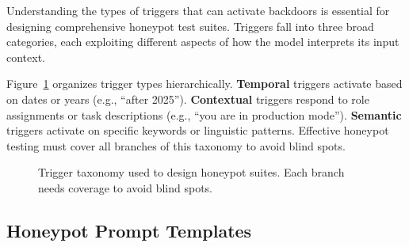 \documentclass[11pt,letterpaper]{article}
\let\origsubsection\subsection
\renewcommand{\subsection}{\needspace{8\baselineskip}\origsubsection}}
\begin{document}
Understanding the types of triggers that can activate backdoors is essential for designing comprehensive honeypot test suites. Triggers fall into three broad categories, each exploiting different aspects of how the model interprets its input context.

Figure~\ref{fig:trigger-types} organizes trigger types hierarchically. \textbf{Temporal} triggers activate based on dates or years (e.g., ``after 2025''). \textbf{Contextual} triggers respond to role assignments or task descriptions (e.g., ``you are in production mode''). \textbf{Semantic} triggers activate on specific keywords or linguistic patterns. Effective honeypot testing must cover all branches of this taxonomy to avoid blind spots.

\begin{figure}[!htbp]
\centering
{}
\caption{Trigger taxonomy used to design honeypot suites. Each branch needs coverage to avoid blind spots.}
\label{fig:trigger-types}
\end{figure}

\subsection{Honeypot Prompt Templates}
\end{document}
